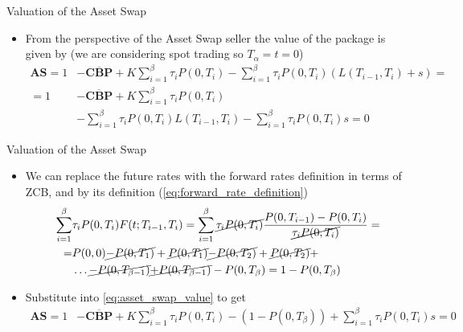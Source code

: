 \documentclass{beamer}
\begin{document}
\begin{frame}{Valuation of the Asset Swap}
	\begin{itemize}
		\item From the perspective of the Asset Swap seller the value of the package is given by (we are considering spot trading so $T_\alpha = t = 0$)
		\begin{equation}
			\begin{aligned}
				\textbf{AS}=1&-\overline{\textbf{CBP}}+K\sum_{i=1}^{\beta}\tau_i P(0,T_i)-\sum_{i=1}^{\beta}\tau_i P(0,T_i)(L(T_{i-1},T_i)+s) =\\
				=1&-\overline{\textbf{CBP}}+K\sum_{i=1}^{\beta}\tau_i P(0,T_i)\\
				&-\sum_{i=1}^{\beta}\tau_i P(0,T_i)L(T_{i-1},T_i)-\sum_{i=1}^{\beta}\tau_i P(0,T_i)s=0
			\end{aligned}
			\label{eq:asset_swap_value}
		\end{equation}
	\end{itemize}
\end{frame}

\begin{frame}{Valuation of the Asset Swap}
	\begin{itemize}
		\item We can replace the future rates with the forward rates definition in terms of ZCB, and by its definition (\cref{eq:forward_rate_definition})
		\begin{equation*}
			\begin{aligned}
				\sum_{i=1}^\beta &\tau_i P(0,T_i)F(t;T_{i-1},T_i) =  \sum_{i=1}^\beta \cancel{\tau_i P(0,T_i)}\frac{P(0,T_{i-1})-P(0,T_i)}{\cancel{\tau_i P(0,T_i)}} = \\
				= &P(0,0) \cancel{- P(0,T_1)} + \cancel{P(0,T_1)} \cancel{- P(0,T_2)} + \cancel{P(0,T_2)} + \\
				&\ldots \cancel{- P(0, T_{\beta-1})} \cancel{+ P(0, T_{\beta-1})}-P(0,T_\beta) = 1-P(0,T_\beta)
			\end{aligned}
		\end{equation*}
		\item Substitute into \cref{eq:asset_swap_value} to get
		\begin{equation*}
			\begin{aligned}
				\textbf{AS}=1&-\overline{\textbf{CBP}}+K\sum_{i=1}^{\beta}\tau_i P(0,T_i) -(1-P(0,T_\beta))
				+ \sum_{i=1}^\beta\tau_i P(0,T_i)s=0
			\end{aligned}
		\end{equation*}
	\end{itemize}
\end{frame}
\end{document}
